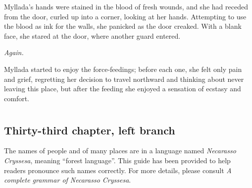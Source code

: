 \centeredstars

Myllada's hands were stained in the blood of fresh wounds, and she had receded from the door, curled up into a corner, looking at her hands. Attempting to use the blood as ink for the walls, she panicked as the door creaked. With a blank face, she stared at the door, where another guard entered.

\emph{Again.}

\centeredstars

Myllada started to enjoy the force-feedings; before each one, she felt only pain and grief, regretting her decision to travel northward and thinking about never leaving this place, but after the feeding she enjoyed a sensation of ecstasy and comfort.

\chapter{}

\section{Thirty-third chapter, left branch}

\showchapters

\appendix
\showappendices


The names of people and of many places are in a language named \emph{Necarasso Cryssesa}, meaning ``forest language''. This guide has been provided to help readers pronounce such names correctly. For more details, please consult \emph{A complete grammar of Necarasso Cryssesa}.


